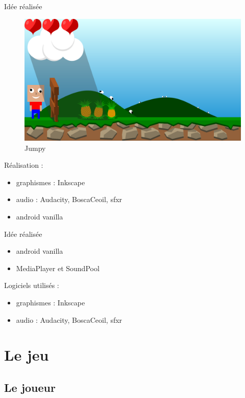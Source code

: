 \documentclass[t,12pt]{beamer}
\begin{document}
\begin{frame}{Idée réalisée}
    \begin{figure}
        \centering
        \includegraphics[width=1\linewidth]{images/game.png}
        \caption{Jumpy}
        \label{fig:jeu}
    \end{figure}
    
    Réalisation :
    \begin{itemize}
        \item graphismes : Inkscape
        \item audio : Audacity, BoscaCeoil, sfxr
        \item android vanilla
    \end{itemize}
\end{frame}

\begin{frame}{Idée réalisée}

    \begin{itemize}
        \item android vanilla
        \item MediaPlayer et SoundPool
    \end{itemize}

    Logiciels utilisés :
    \begin{itemize}
        \item graphismes : Inkscape
        \item audio : Audacity, BoscaCeoil, sfxr
    \end{itemize}
\end{frame}

\section{Le jeu}

\subsection{Le joueur}
\end{document}
